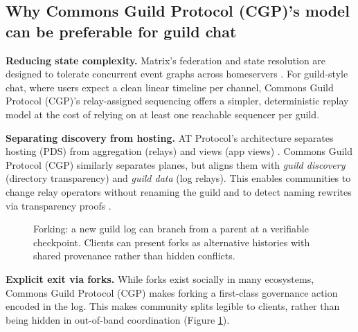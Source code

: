 \documentclass[conference]{IEEEtran}
\newcommand{\cgp}{Commons Guild Protocol (CGP)\xspace}
\newcommand{\atproto}{AT Protocol\xspace}
\begin{document}
\subsection{Why \cgp's model can be preferable for guild chat}
\textbf{Reducing state complexity.} Matrix's federation and state resolution are designed to tolerate concurrent event graphs across homeservers \cite{matrixRoomV2}. For guild-style chat, where users expect a clean linear timeline per channel, \cgp's relay-assigned sequencing offers a simpler, deterministic replay model at the cost of relying on at least one reachable sequencer per guild.

\textbf{Separating discovery from hosting.} \atproto's architecture separates hosting (PDS) from aggregation (relays) and views (app views) \cite{bskyFederation,atprotoSync}. \cgp similarly separates planes, but aligns them with \emph{guild discovery} (directory transparency) and \emph{guild data} (log relays). This enables communities to change relay operators without renaming the guild and to detect naming rewrites via transparency proofs \cite{rfc6962}.

\begin{figure}[!b]
\centering
{}
\caption{Forking: a new guild log can branch from a parent at a verifiable checkpoint. Clients can present forks as alternative histories with shared provenance rather than hidden conflicts.}
\label{fig:fork}
\end{figure}

\newpage
\textbf{Explicit exit via forks.} While forks exist socially in many ecosystems, \cgp makes forking a first-class governance action encoded in the log. This makes community splits legible to clients, rather than being hidden in out-of-band coordination (Figure \ref{fig:fork}).
\end{document}
